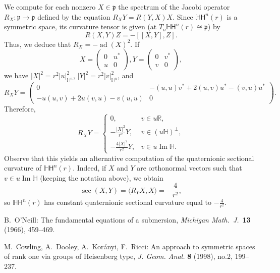 \documentclass[12pt, a4paper,draft]{amsart}
\newcommand{\g}{\mathfrak}
\newcommand{\R}{\mathbb{R}}
\renewcommand{\H}{\mathbb{H}}
\theoremstyle{remark}
\begin{document}
We compute for each nonzero $X\in \g{p}$ the spectrum of the Jacobi operator $R_{X}\colon \g{p}\to \g{p}$ defined by the equation $R_{X}Y=R(Y,X)X$.
Since $\H\mathsf{H}^{n}(r)$ is a symmetric space, its curvature tensor is given (at $T_{o}\H\mathsf{H}^{n}(r)\cong \g{p}$) by
\begin{equation*}
	R(X,Y)Z=-[[X,Y],Z].
\end{equation*}
Thus, we deduce that $R_{X}=-\operatorname{ad}(X)^{2}$.
If
\[
X=\left(
\begin{array}{c|c}
	0 & u^{*} \\
	\hline
	u & 0
\end{array}
\right),
Y=\left(
\begin{array}{c|c}
	0 & v^{*} \\
	\hline
	v & 0
\end{array}
\right),
\]
we have $\lvert X\rvert^{2}=r^{2}\lvert u \rvert^{2}_{\H^{n}}$, $\lvert Y\rvert^{2}=r^{2}\lvert v \rvert^{2}_{\H^{n}}$, and
\[
	R_{X}Y=\left(
	\begin{array}{c|c}
		0 & -(u,u)v^{*}+2(u,v)u^{*}-(v,u)u^{*} \\
		\hline
		-u(u,v)+2u(v,u)-v(u,u) & 0
	\end{array}
	\right).
\]
Therefore,
\[
	R_{X}Y=
	\begin{cases}
		0, & v\in u\R, \\
		-\frac{\lvert X \rvert^{2}}{r^{2}}Y, & v\in (u\H)^{\perp}, \\
		-\frac{4 \lvert X \rvert^{2}}{r^{2}} Y, & v\in u\operatorname{Im}\H.
	\end{cases}
\]
Observe that this yields an alternative computation of the quaternionic sectional curvature of $\H\mathsf{H}^{n}(r)$.
Indeed, if $X$ and $Y$ are orthonormal vectors such that $v\in u \operatorname{Im}\H$ (keeping the notation above), we obtain
\[
	\operatorname{sec}(X,Y)=\langle R_{Y}X,X \rangle=-\frac{4}{r^{2}},
\]
so $\H\mathsf{H}^{n}(r)$ has constant quaternionic sectional curvature equal to $-\frac{4}{r^{2}}$.

\begin{thebibliography}{99}
B.~O'Neill: The fundamental equations of a submersion, \textit{Michigan Math.\ J.}\ \textbf{13} (1966), 459--469.

 M.~Cowling, A.~Dooley, A.~Kor\'{a}nyi, F.~Ricci: An approach to symmetric spaces of rank one via groups of Heisenberg type, \textit{J. Geom. Anal.} \textbf{8} (1998), no.2, 199--237.
\end{thebibliography}
\end{document}

